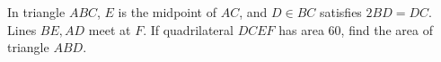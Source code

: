 In triangle $ABC$, $E$ is the midpoint of $AC$, and $D\in BC$ satisfies $2BD=DC$. Lines $BE,AD$ meet at $F$. If quadrilateral $DCEF$ has area 60, find the area of triangle $ABD$.
